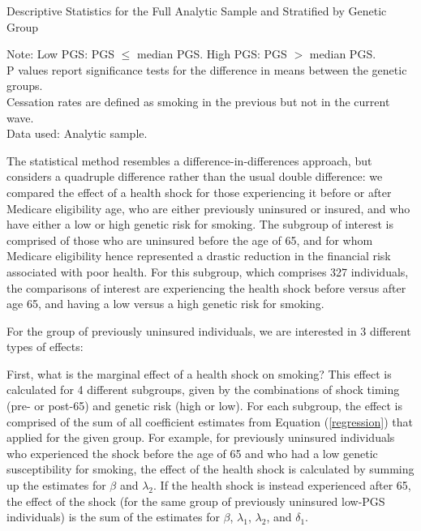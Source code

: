 \documentclass[12pt]{article}
\begin{document}
\begin{table}[!h]
	\caption{Descriptive Statistics for the Full Analytic Sample and Stratified by Genetic Group \vspace{-0.3cm}}
	\label{tab:descriptives_full}
	\resizebox{\textwidth}{!}{
		\Large 
	}
			\footnotesize
	\begin{flushleft}
	Note: Low PGS: PGS $\leq$ median PGS. High PGS: PGS $>$ median PGS.\\
	P values report significance tests for the difference in means between the genetic groups.\\
	Cessation rates are defined as smoking in the previous but not in the current wave.\\
	Data used: Analytic sample.
	\end{flushleft}
\end{table}

The statistical method resembles a difference-in-differences approach, but considers a quadruple difference rather than the usual double difference: we compared the effect of a health shock for those experiencing it before or after Medicare eligibility age, who are either previously uninsured or insured, and who have either a low or high genetic risk for smoking. The subgroup of interest is comprised of those who are uninsured before the age of 65, and for whom Medicare eligibility hence represented a drastic reduction in the financial risk associated with poor health. For this subgroup, which comprises 327 individuals, the comparisons of interest are experiencing the health shock before versus after age 65, and having a low versus a high genetic risk for smoking.

For the group of previously uninsured individuals, we are interested in 3 different types of effects:

First, what is the marginal effect of a health shock on smoking? This effect is calculated for 4 different subgroups, given by the combinations of shock timing (pre- or post-65) and genetic risk (high or low). For each subgroup, the effect is comprised of the sum of all coefficient estimates from Equation (\ref{regression}) that applied for the given group. For example, for previously uninsured individuals who experienced the shock before the age of 65 and who had a low genetic susceptibility for smoking, the effect of the health shock is calculated by summing up the estimates for $\beta$ and $\lambda_2$. If the health shock is instead experienced after 65, the effect of the shock (for the same group of previously uninsured low-PGS individuals) is the sum of the estimates for $\beta$, $\lambda_1$, $\lambda_2$, and $\delta_1$.
\end{document}
